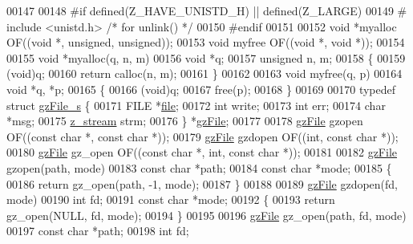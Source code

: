\begin{DoxyCode}
{{{00147 
00148 \textcolor{preprocessor}{#if defined(Z\_HAVE\_UNISTD\_H) || defined(Z\_LARGE)}
00149 \textcolor{preprocessor}{#  include <unistd.h>}       \textcolor{comment}{/* for unlink() */}
00150 \textcolor{preprocessor}{#endif}
00151 
00152 \textcolor{keywordtype}{void} *myalloc OF((\textcolor{keywordtype}{void} *, \textcolor{keywordtype}{unsigned}, \textcolor{keywordtype}{unsigned}));
00153 \textcolor{keywordtype}{void} myfree OF((\textcolor{keywordtype}{void} *, \textcolor{keywordtype}{void} *));
00154 
00155 \textcolor{keywordtype}{void} *myalloc(q, n, m)
00156     \textcolor{keywordtype}{void} *q;
00157     \textcolor{keywordtype}{unsigned} n, m;
00158 \{
00159     (void)q;
00160     \textcolor{keywordflow}{return} calloc(n, m);
00161 \}
00162 
00163 \textcolor{keywordtype}{void} myfree(q, p)
00164     \textcolor{keywordtype}{void} *q, *p;
00165 \{
00166     (void)q;
00167     free(p);
00168 \}
00169 
00170 \textcolor{keyword}{typedef} \textcolor{keyword}{struct }\hyperlink{structgz_file__s}{gzFile\_s} \{
00171     FILE *\hyperlink{structfile}{file};
00172     \textcolor{keywordtype}{int} write;
00173     \textcolor{keywordtype}{int} err;
00174     \textcolor{keywordtype}{char} *msg;
00175     \hyperlink{structz__stream__s}{z\_stream} strm;
00176 \} *\hyperlink{structgz_file__s}{gzFile};
00177 
00178 \hyperlink{structgz_file__s}{gzFile} gzopen OF((\textcolor{keyword}{const} \textcolor{keywordtype}{char} *, \textcolor{keyword}{const} \textcolor{keywordtype}{char} *));
00179 \hyperlink{structgz_file__s}{gzFile} gzdopen OF((\textcolor{keywordtype}{int}, \textcolor{keyword}{const} \textcolor{keywordtype}{char} *));
00180 \hyperlink{structgz_file__s}{gzFile} gz\_open OF((\textcolor{keyword}{const} \textcolor{keywordtype}{char} *, \textcolor{keywordtype}{int}, \textcolor{keyword}{const} \textcolor{keywordtype}{char} *));
00181 
00182 \hyperlink{structgz_file__s}{gzFile} gzopen(path, mode)
00183 \textcolor{keyword}{const} \textcolor{keywordtype}{char} *path;
00184 \textcolor{keyword}{const} \textcolor{keywordtype}{char} *mode;
00185 \{
00186     \textcolor{keywordflow}{return} gz\_open(path, -1, mode);
00187 \}
00188 
00189 \hyperlink{structgz_file__s}{gzFile} gzdopen(fd, mode)
00190 \textcolor{keywordtype}{int} fd;
00191 \textcolor{keyword}{const} \textcolor{keywordtype}{char} *mode;
00192 \{
00193     \textcolor{keywordflow}{return} gz\_open(NULL, fd, mode);
00194 \}
00195 
00196 \hyperlink{structgz_file__s}{gzFile} gz\_open(path, fd, mode)
00197     \textcolor{keyword}{const} \textcolor{keywordtype}{char} *path;
00198     \textcolor{keywordtype}{int} fd;
}}}
\end{DoxyCode}
